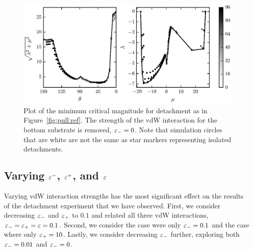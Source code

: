 	\begin{figure}[t]
		\begin{center}
			\includegraphics{./fig/ch3/pull/eb0/grid.eps}
		\end{center}		
		\caption{Plot of the minimum critical magnitude for detachment as in Figure~\ref{fig:pull:ref}. The strength of the vdW interaction for the bottom substrate is removed, $\varepsilon_-=0$. Note that simulation circles that are white are not the same as star markers representing isolated detachments.
		\label{fig:pull:eb0}}
	\end{figure}

\subsection{Varying $\varepsilon^-$, $\varepsilon^+$, and $\varepsilon$} \label{section:detachment:eps}

Varying vdW interaction strengths has the most significant effect on the results of the detachment experiment that we have observed. First, we consider decreasing $\varepsilon_-$ and $\varepsilon_+$ to $0.1$ and related all three vdW interactions, $\varepsilon_- = \varepsilon_+ = \varepsilon = 0.1$. Second, we consider the case were only $\varepsilon_-=0.1$ and the case where only $\varepsilon_+=10$. Lastly, we consider decreasing $\varepsilon_-$ further, exploring both $\varepsilon_-=0.01$ and $\varepsilon_-=0$.

